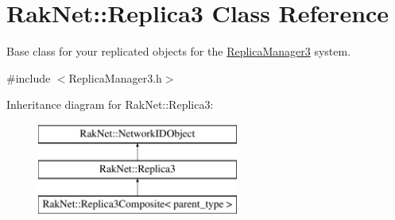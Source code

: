 \hypertarget{class_rak_net_1_1_replica3}{\section{Rak\-Net\-:\-:Replica3 Class Reference}
\label{class_rak_net_1_1_replica3}
}


Base class for your replicated objects for the \hyperlink{class_rak_net_1_1_replica_manager3}{Replica\-Manager3} system.  




{\ttfamily \#include $<$Replica\-Manager3.\-h$>$}

Inheritance diagram for Rak\-Net\-:\-:Replica3\-:\begin{figure}[H]
\begin{center}
\leavevmode
\includegraphics[height=3.000000cm]{class_rak_net_1_1_replica3}
\end{center}
\end{figure}
